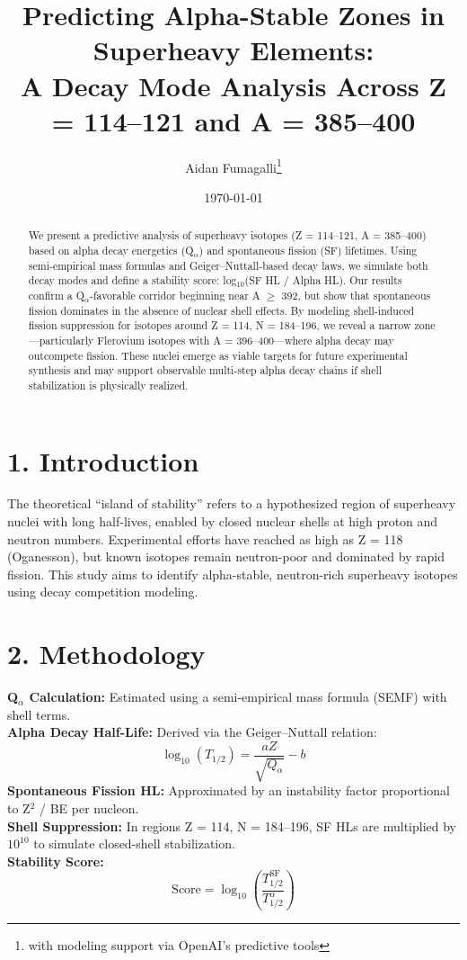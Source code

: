 \documentclass[12pt]{article}
\title{\textbf{Predicting Alpha-Stable Zones in Superheavy Elements:\\ A Decay Mode Analysis Across Z = 114--121 and A = 385--400}}
\author{Aidan Fumagalli\thanks{with modeling support via OpenAI's predictive tools}}
\date{\today}
\begin{document}
\maketitle

\begin{abstract}
We present a predictive analysis of superheavy isotopes (Z = 114--121, A = 385--400) based on alpha decay energetics (Q$_\alpha$) and spontaneous fission (SF) lifetimes. Using semi-empirical mass formulas and Geiger--Nuttall-based decay laws, we simulate both decay modes and define a stability score: log$_{10}$(SF HL / Alpha HL). Our results confirm a Q$_\alpha$-favorable corridor beginning near A $\geq$ 392, but show that spontaneous fission dominates in the absence of nuclear shell effects. By modeling shell-induced fission suppression for isotopes around Z = 114, N = 184--196, we reveal a narrow zone—particularly Flerovium isotopes with A = 396--400—where alpha decay may outcompete fission. These nuclei emerge as viable targets for future experimental synthesis and may support observable multi-step alpha decay chains if shell stabilization is physically realized.
\end{abstract}

\section*{1. Introduction}
The theoretical ``island of stability'' refers to a hypothesized region of superheavy nuclei with long half-lives, enabled by closed nuclear shells at high proton and neutron numbers. Experimental efforts have reached as high as Z = 118 (Oganesson), but known isotopes remain neutron-poor and dominated by rapid fission. This study aims to identify alpha-stable, neutron-rich superheavy isotopes using decay competition modeling.

\section*{2. Methodology}

\textbf{Q$_\alpha$ Calculation:} Estimated using a semi-empirical mass formula (SEMF) with shell terms.\\
\textbf{Alpha Decay Half-Life:} Derived via the Geiger--Nuttall relation:
\[
\log_{10}(T_{1/2}) = \frac{aZ}{\sqrt{Q_\alpha}} - b
\]
\textbf{Spontaneous Fission HL:} Approximated by an instability factor proportional to Z$^2$ / BE per nucleon.\\
\textbf{Shell Suppression:} In regions Z = 114, N = 184--196, SF HLs are multiplied by $10^{10}$ to simulate closed-shell stabilization.\\
\textbf{Stability Score:}
\[
\text{Score} = \log_{10} \left( \frac{T_{1/2}^{\text{SF}}}{T_{1/2}^{\alpha}} \right)
\]
\end{document}
